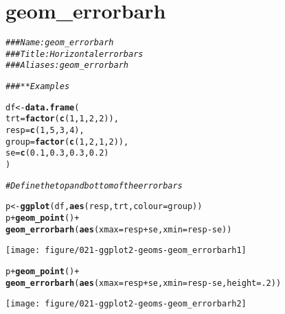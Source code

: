 \documentclass[a4paper,titlepage]{tufte-handout}\usepackage[]{graphicx}\usepackage[]{color}
\makeatletter
\def\maxwidth{ %
  \ifdim\Gin@nat@width>\linewidth
    \linewidth
  \else
    \Gin@nat@width
  \fi
}
\newcommand{\hlnum}[1]{\textcolor[rgb]{0.686,0.059,0.569}{#1}}%
\newcommand{\hlcom}[1]{\textcolor[rgb]{0.678,0.584,0.686}{\textit{#1}}}%
\newcommand{\hlopt}[1]{\textcolor[rgb]{0,0,0}{#1}}%
\newcommand{\hlstd}[1]{\textcolor[rgb]{0.345,0.345,0.345}{#1}}%
\newcommand{\hlkwb}[1]{\textcolor[rgb]{0.69,0.353,0.396}{#1}}%
\newcommand{\hlkwc}[1]{\textcolor[rgb]{0.333,0.667,0.333}{#1}}%
\newcommand{\hlkwd}[1]{\textcolor[rgb]{0.737,0.353,0.396}{\textbf{#1}}}%
\newenvironment{kframe}{%
 \def\at@end@of@kframe{}%
 \ifinner\ifhmode%
  \def\at@end@of@kframe{\end{minipage}}%
  \begin{minipage}{\columnwidth}%
 \fi\fi%
 \def\FrameCommand##1{\hskip\@totalleftmargin \hskip-\fboxsep
 \colorbox{shadecolor}{##1}\hskip-\fboxsep
     \hskip-\linewidth \hskip-\@totalleftmargin \hskip\columnwidth}%
 \MakeFramed {\advance\hsize-\width
   \@totalleftmargin\z@ \linewidth\hsize
   \@setminipage}}%
 {\par\unskip\endMakeFramed%
 \at@end@of@kframe}
\newenvironment{knitrout}{}{} %
\makeatother
\begin{document}
\section{geom\_errorbarh}

\begin{knitrout}
\color{fgcolor}\begin{kframe}
\begin{alltt}
\hlcom{### Name: geom_errorbarh}
\hlcom{### Title: Horizontal error bars}
\hlcom{### Aliases: geom_errorbarh}

\hlcom{### ** Examples}

\hlstd{df} \hlkwb{<-} \hlkwd{data.frame}\hlstd{(}
  \hlkwc{trt} \hlstd{=} \hlkwd{factor}\hlstd{(}\hlkwd{c}\hlstd{(}\hlnum{1}\hlstd{,} \hlnum{1}\hlstd{,} \hlnum{2}\hlstd{,} \hlnum{2}\hlstd{)),}
  \hlkwc{resp} \hlstd{=} \hlkwd{c}\hlstd{(}\hlnum{1}\hlstd{,} \hlnum{5}\hlstd{,} \hlnum{3}\hlstd{,} \hlnum{4}\hlstd{),}
  \hlkwc{group} \hlstd{=} \hlkwd{factor}\hlstd{(}\hlkwd{c}\hlstd{(}\hlnum{1}\hlstd{,} \hlnum{2}\hlstd{,} \hlnum{1}\hlstd{,} \hlnum{2}\hlstd{)),}
  \hlkwc{se} \hlstd{=} \hlkwd{c}\hlstd{(}\hlnum{0.1}\hlstd{,} \hlnum{0.3}\hlstd{,} \hlnum{0.3}\hlstd{,} \hlnum{0.2}\hlstd{)}
\hlstd{)}

\hlcom{# Define the top and bottom of the errorbars}

\hlstd{p} \hlkwb{<-} \hlkwd{ggplot}\hlstd{(df,} \hlkwd{aes}\hlstd{(resp, trt,} \hlkwc{colour} \hlstd{= group))}
\hlstd{p} \hlopt{+} \hlkwd{geom_point}\hlstd{()} \hlopt{+}
  \hlkwd{geom_errorbarh}\hlstd{(}\hlkwd{aes}\hlstd{(}\hlkwc{xmax} \hlstd{= resp} \hlopt{+} \hlstd{se,} \hlkwc{xmin} \hlstd{= resp} \hlopt{-} \hlstd{se))}
\end{alltt}
\end{kframe}
\texttt{[image: figure/021-ggplot2-geoms-geom\_errorbarh1]} 
\begin{kframe}\begin{alltt}
\hlstd{p} \hlopt{+} \hlkwd{geom_point}\hlstd{()} \hlopt{+}
  \hlkwd{geom_errorbarh}\hlstd{(}\hlkwd{aes}\hlstd{(}\hlkwc{xmax} \hlstd{= resp} \hlopt{+} \hlstd{se,} \hlkwc{xmin} \hlstd{= resp} \hlopt{-} \hlstd{se,} \hlkwc{height} \hlstd{=} \hlnum{.2}\hlstd{))}
\end{alltt}
\end{kframe}
\texttt{[image: figure/021-ggplot2-geoms-geom\_errorbarh2]} 
\begin{kframe}\begin{alltt}


\end{alltt}
\end{kframe}
\end{knitrout}
\end{document}
